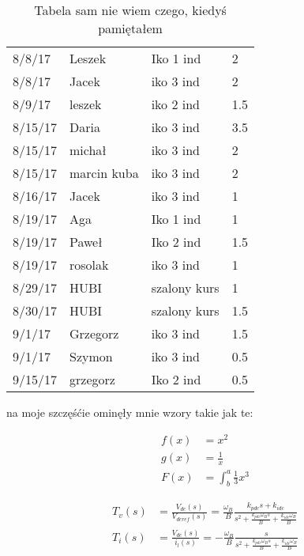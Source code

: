 \documentclass{article}
\begin{document}
\begin{table}[!ht]
\begin{tabular}{llll}
8/8/17  & Leszek           & Iko 1 ind    & 2     \\
8/8/17  & Jacek            & iko 3 ind    & 2     \\
8/9/17  & leszek           & iko 2 ind    & 1.5   \\
8/15/17 & Daria            & iko 3 ind    & 3.5   \\
8/15/17 & michał           & iko 3 ind    & 2     \\
8/15/17 & marcin kuba      & iko 3 ind    & 2     \\
8/16/17 & Jacek            & iko 3 ind    & 1     \\
8/19/17 & Aga              & Iko 1 ind    & 1     \\
8/19/17 & Paweł            & Iko 2 ind    & 1.5   \\
8/19/17 & rosolak          & iko 3 ind    & 1     \\
8/29/17 & HUBI             & szalony kurs & 1     \\
8/30/17 & HUBI             & szalony kurs & 1.5   \\
9/1/17  & Grzegorz         & iko 3 ind    & 1.5   \\
9/1/17  & Szymon           & iko 3 ind    & 0.5   \\
9/15/17 & grzegorz         & Iko 2 ind    & 0.5  
		\end{tabular}
	\caption{Tabela sam nie wiem czego, kiedyś pamiętałem}
	\end{table}
	
	na moje szczęśćie ominęły mnie wzory takie jak te: 
	
	\begin{eqnarray}
			f(x) &= x^2\\
  			g(x) &= \frac{1}{x}\\
  			F(x) &= \int^a_b \frac{1}{3}x^3
	\end{eqnarray}
	
	\begin{equ}[!ht]
	\begin{equation} 
	\begin{split}
	T_v(s) & = \frac{V_{dc}(s)}{V_{dcref}(s)} = \frac{\omega _B}{B}
	\frac{k_{pdc}s + k_{idc}} {s^2 + \frac{ k_{pdc} \omega _B s} {B} +
	\frac{k_{idc} \omega _B} {B}} \\%
	T_i(s) & = \frac{V_{dc}(s)}{i_{l}(s)} = - \frac{\omega _B}{B} \frac{s} {s^2
	+ \frac{ k_{pdc} \omega _B s} {B} + \frac{k_{idc} \omega _B} {B}}
	\end{split}
	\end{equation}
	\caption{No tu się muszę przyznać, znalazłem tę (5) kozę w internecie}
	\end{equ}
	
\end{document}
